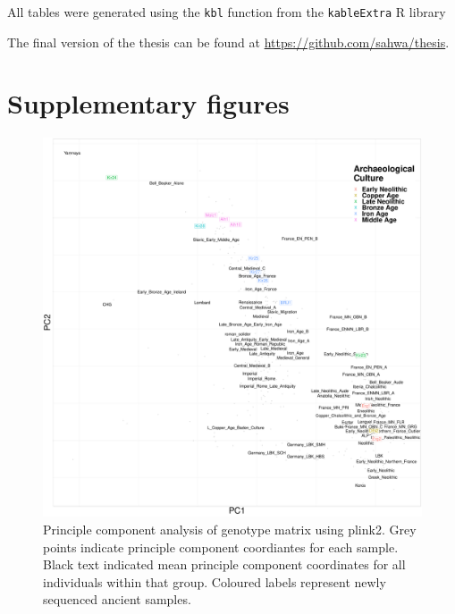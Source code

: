 All tables were generated using the \texttt{kbl} function from the \texttt{kableExtra} R library

The final version of the thesis can be found at \url{https://github.com/sahwa/thesis}.

\chapter{Supplementary figures}
\label{appendixlabel4}

\begin{figure}[htp]
    \centering
    \includegraphics[width=1.0\textwidth]{../images/appendix/plink_withHG_PCA.pdf}
    \caption{Principle component analysis of genotype matrix using plink2. Grey points indicate principle component coordiantes for each sample. Black text indicated mean principle component coordinates for all individuals within that group. Coloured labels represent newly sequenced ancient samples. }
    \label{fig:plink_PCA_HG}
\end{figure}

